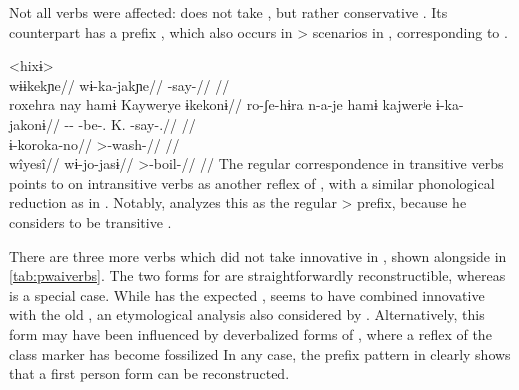 Not all  verbs were affected: \waiwai {}  does not take , but rather conservative  .
Its \hixka counterpart has a prefix  , which also occurs in > scenarios in \hixka {}, corresponding to \waiwai {} .

\pex<hixɨ>
 \waiwai \parencite[][71]{waiwaihawkins1998}\\
\begingl
\glpreamble wɨɨkekɲe//
\gla wɨ-ka-jakɲe//
\glb {}-say-//
\glft {}//
\endgl
{} \hixka \parencite[][124]{hixkaryanaderby1985}\\
\begingl
\glpreamble roxehra nay hamɨ Kaywerye ɨkekonɨ//
\gla ro-ʃe-hɨra n-a-je hamɨ kajwerʲe ɨ-ka-jakonɨ//
\glb {}-- -be-.  K. -say-.//
\glft {}//
\endgl
{} \hixka \parencite[][191]{hixkaryanaderby1985}\\
\begingl
\gla ɨ-koroka-no//
\glb {}>-wash-//
\glft {}//
\endgl
{} \waiwai \parencite[][192]{waiwaihawkins1998}\\
\begingl
\glpreamble wîyesî//
\gla wɨ-jo-jasɨ//
\glb {}>-boil-//
\glft {}//
\endgl
\xe
%
The regular correspondence in transitive verbs points to \hixka {} on intransitive verbs as another reflex of , with a similar phonological reduction as in \ikpeng {}.
Notably, \textcite{hixkaryanaderby1985} analyzes this  as the regular > prefix, because he considers \hixka {}  to be transitive .

There are three more verbs which did not take innovative  in \PWai, shown alongside   in \cref{tab:pwaiverbs}.
The two forms for  are straightforwardly reconstructible, whereas  is a special case.
While \hixka has the expected , \waiwai seems to have combined innovative  with the old , an etymological analysis also considered by \textcite[90]{gildea1998}.
Alternatively, this form may have been influenced by deverbalized forms of , where a reflex of the  class marker  has become fossilized 
%
%
In any case, the prefix pattern in \hixka {} clearly shows that a \PWai first person form  can be reconstructed.

